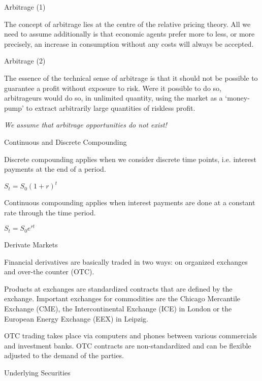 { Arbitrage (1)}
  \item The concept of arbitrage lies at
the centre of the relative pricing theory. All we need to assume additionally is
that economic agents prefer
more to less, or more precisely, an increase in consumption
without any costs will always be accepted.

{ Arbitrage (2)}
  \item The essence of the technical sense of arbitrage is that it should
not be possible to guarantee a profit without exposure to risk.
Were it possible to do so, arbitrageurs would do so, in unlimited quantity,
using the market as a \lq {money-pump}' to extract arbitrarily
large quantities of riskless profit.
  \item {\it We assume that arbitrage opportunities do not exist!}

{Continuous and Discrete Compounding}
  \item <1->Discrete compounding applies when we consider discrete time points, i.e. interest payments at the end of a period.\\
        \item $S_t = S_0 (1+r)^t$

  \item<2-> Continuous compounding applies when interest payments are done at a constant rate through the time period. \\
        \item $S_t = S_0e^{rt}$

{Derivate Markets}
  \item<1-> Financial derivatives are basically traded in two ways: on organized exchanges and over-the counter (OTC).
  \item<2-> Products at exchanges are standardized contracts that are defined by the exchange. Important exchanges for commodities are the Chicago Mercantile Exchange (CME), the Intercontinental Exchange (ICE) in London or the European Energy Exchange (EEX) in Leipzig.
  \item<3-> OTC trading takes place via computers and phones between various commercials and investment banks. OTC contracts are non-standardized and can be flexible adjusted to the demand of the parties.

{Underlying Securities}

